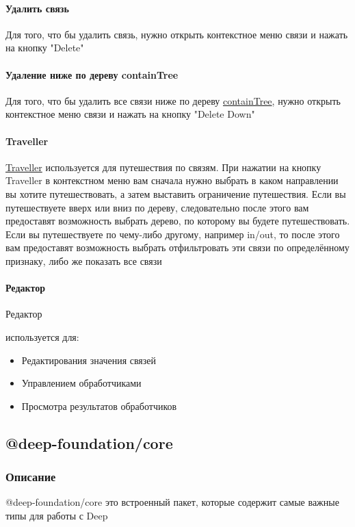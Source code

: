 \documentclass{article}
\begin{document}
\paragraph{Удалить связь}
Для того, что бы удалить связь, нужно открыть контекстное меню связи и нажать
на кнопку "Delete"
\paragraph{Удаление ниже по дереву
  containTree}\hypertarget{containTree.Deletion.Example}{}
Для того, что бы удалить все связи ниже по дереву
\hyperlink{containTree.Description}{containTree}, нужно открыть контекстное меню связи
и нажать на кнопку "Delete Down"
\paragraph*{Traveller}
\hyperlink{Traveller.Description}{Traveller} используется для путешествия по связям.
При нажатии на кнопку Traveller в контекстном меню вам сначала нужно выбрать в
каком направлении вы хотите путешествовать, а затем выставить ограничение
путешествия.
Если вы путешествуете вверх или вниз по дереву, следовательно после этого вам
предоставят возможность выбрать дерево, по которому вы будете путешествовать.
Если вы путешествуете по чему-либо другому, например in/out, то после этого вам
предоставят возможность выбрать отфильтровать эти связи по определённому
признаку, либо же показать все связи
\paragraph*{Редактор}
\hypertarget{Editor.Description}{Редактор} используется для:
\begin{itemize}
  \item Редактирования значения связей
  \item Управлением обработчиками
  \item Просмотра результатов обработчиков
\end{itemize}


\subsection{@deep-foundation/core}
\subsubsection{Описание}\hypertarget{Core.Description}{}
@deep-foundation/core это встроенный пакет, которые
содержит самые важные типы для работы с Deep
\end{document}
